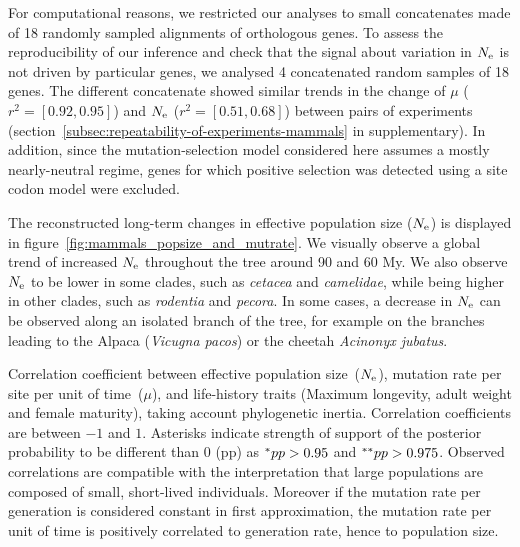 For computational reasons, we restricted our analyses to small concatenates made of 18 randomly sampled alignments of orthologous genes.
To assess the reproducibility of our inference and check that the signal about variation in $N_{\text{e}}$ is not driven by particular genes, we analysed 4 concatenated random samples of 18 genes.
The different concatenate showed similar trends in the change of $\mu$ ($r^2=[0.92,0.95]$) and $N_{\text{e}}$ ($r^2=[0.51,0.68]$) between pairs of experiments (section~\ref{subsec:repeatability-of-experiments-mammals} in supplementary).
In addition, since the mutation-selection model considered here assumes a mostly \gls{nearly-neutral} regime, genes for which positive selection was detected using a site \gls{codon} model were excluded.

The reconstructed long-term changes in \gls{effective population size} ($N_{\text{e}}$) is displayed in figure~\ref{fig:mammals_popsize_and_mutrate}.
We visually observe a global trend of increased $N_{\text{e}}$ throughout the tree around 90 and 60 My.
We also observe $N_{\text{e}}$ to be lower in some clades, such as \textit{cetacea} and \textit{camelidae}, while being higher in other clades, such as \textit{rodentia} and \textit{pecora}.
In some cases, a decrease in $N_{\text{e}}$ can be observed along an isolated branch of the tree, for example on the branches leading to the Alpaca (\textit{Vicugna pacos}) or the cheetah \textit{Acinonyx jubatus}.

\begin{table}[h]
    
    \caption[Traits correlation in mammals]{
    Correlation coefficient between effective population size~($N_{\text{e}}$), mutation rate per site per unit of time~($\mu$), and life-history traits (Maximum longevity, adult weight and female maturity), taking account phylogenetic inertia.
    Correlation coefficients are between $-1$ and $1$.
    Asterisks indicate strength of support of the \gls{posterior} probability to be different than $0$ (pp) as $\smash{^{*}} pp > 0.95$ and $\smash{^{**}} pp > 0.975$.
    Observed correlations are compatible with the interpretation that large populations are composed of small, short-lived individuals.
    Moreover if the mutation rate per generation is considered constant in first approximation, the mutation rate per unit of time is positively correlated to generation rate, hence to population size.
    }
    \label{tab:mammals_correlation}
\end{table}

